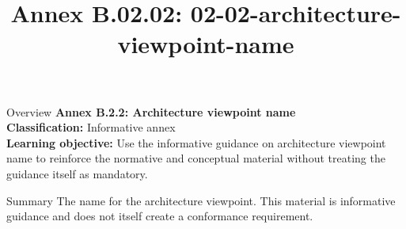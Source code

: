 \documentclass[10pt,letterpaper]{article}
\title{Annex B.02.02: 02-02-architecture-viewpoint-name}
\author{}
\date{}
\begin{document}
\maketitle
\begin{CornellOverviewBox}{Overview}
{\Large\bfseries\textcolor{CNavy}{Annex B.2.2: Architecture viewpoint name}}\\[3pt]
{\small\textbf{Classification:} Informative annex}\\
{\small\textbf{Learning objective:} Use the informative guidance on architecture viewpoint name to reinforce the normative and conceptual material without treating the guidance itself as mandatory.}
\end{CornellOverviewBox}
\vspace{3pt}

\begin{CornellNotesTable}
\end{CornellNotesTable}


\begin{CornellSummaryBox}{Summary}
The name for the architecture viewpoint. This material is informative guidance and does not itself create a conformance requirement.
\end{CornellSummaryBox}
\end{document}
